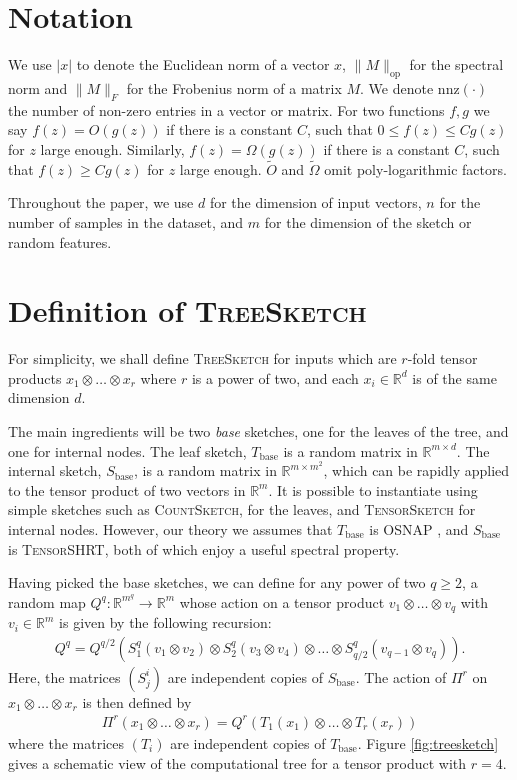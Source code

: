 \documentclass{article}
\theoremstyle{plain}
\theoremstyle{definition}
\theoremstyle{remark}
\newcommand{\eq}[1]{\begin{align*}#1\end{align*}}
\newcommand{\R}{\mathbb{R}}
\begin{document}





\clearpage
\appendix

\section{Notation}

We use $|x|$ to denote the Euclidean norm of a vector $x$, $\|M\|_\text{op}$ for the spectral norm and $\|M\|_F$ for the Frobenius norm of a matrix $M$. We denote $\text{nnz}(\cdot)$ the number of non-zero entries in a vector or matrix. For two functions $f, g$ we say $f(z) = O(g(z))$ if there is a constant $C$, such that $0 \le f(z) \le C g(z)$ for $z$ large enough. Similarly, $f(z) = \Omega(g(z))$ if there is a constant $C$, such that $f(z) \ge C g(z)$ for $z$ large enough. $\tilde O$ and $\tilde \Omega$ omit poly-logarithmic factors. 

Throughout the paper, we use $d$ for the dimension of input vectors, $n$ for the number of samples in the dataset, and $m$ for the dimension of the sketch or random features.  

\section{Definition of \textsc{TreeSketch}}
\label{apdx:ahle-sketch}

For simplicity, we shall define \textsc{TreeSketch} \citep{ahle2020oblivious} for inputs which are $r$-fold tensor products $x_1\otimes\dots\otimes x_r$ where $r$ is a power of two, and each $x_i\in\R^d$ is of the same dimension $d$.

The main ingredients will be two \emph{base} sketches, one for the leaves of the tree, and one for internal nodes. The leaf sketch, $T_\text{base}$ is a random matrix in $\R^{m\times d}$. The internal sketch, $S_\text{base}$, is a random matrix in $\R^{m\times m^2}$, which can be rapidly applied to the tensor product of two vectors in $\R^m$. It is possible to instantiate  using simple sketches such as \textsc{CountSketch}, for the leaves, and \textsc{TensorSketch} for internal nodes. However, our theory we assumes that $T_\text{base}$ is \textsc{OSNAP} \citep{nelson2013osnap}, and $S_\text{base}$ is \textsc{TensorSHRT}, both of which enjoy a useful spectral property. 

Having picked the base sketches, we can define for any power of two $q\ge 2$, a random map $Q^q: \R^{m^q} \to \R^m$ whose action on a tensor product $v_1\otimes \dots\otimes v_q$ with $v_i\in\R^m$ is given by the following recursion:
\eq{
Q^q = Q^{q/2}(S^q_1(v_1\otimes v_2)\otimes S^q_2(v_3\otimes v_4)\otimes \dots\otimes S^q_{q/2}(v_{q-1}\otimes v_{q})).
}
Here, the matrices $(S^i_j)$ are independent copies of $S_\text{base}$. The action of  $\Pi^r$ on $x_1\otimes\dots\otimes x_r$ is then defined by
\eq{
\Pi^r(x_1\otimes\dots\otimes x_r) = Q^r(T_1(x_1)\otimes\dots \otimes T_r(x_r))
}
where the matrices $(T_i)$ are independent copies of $T_\text{base}$. Figure \ref{fig:treesketch} gives a schematic view of the computational tree for a tensor product with $r=4$. 
\end{document}
